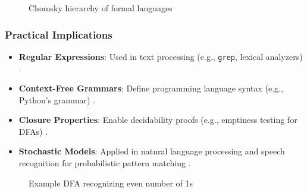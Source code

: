 \begin{figure} [h]
    \centering
    \caption{Chomsky hierarchy of formal languages}
    \label{fig:chomsky-hierarchy}
\end{figure}


\subsubsection{Practical Implications}
\begin{itemize}
    \item \textbf{Regular Expressions}: Used in text processing (e.g., \texttt{grep}, lexical analyzers) \cite{kernighan1984unix, hopcroft2006introduction}.  
    \item \textbf{Context-Free Grammars}: Define programming language syntax (e.g., Python’s grammar) \cite{chomsky1956three, hopcroft2006introduction}.  
    \item \textbf{Closure Properties}: Enable decidability proofs (e.g., emptiness testing for DFAs) \cite{hopcroft2006introduction}.  
    \item \textbf{Stochastic Models}: Applied in natural language processing and speech recognition for probabilistic pattern matching \cite{rabin1963probabilistic}.  
\end{itemize}

\begin{figure}[h]
    \centering
    \caption{Example DFA recognizing even number of 1s}
    \label{fig:dfa-example}
\end{figure}

